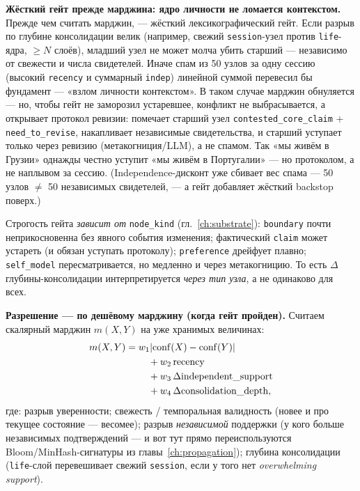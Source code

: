 \smallskip\noindent\textbf{Жёсткий гейт прежде марджина: ядро личности не ломается контекстом.}
Прежде чем считать марджин, --- жёсткий лексикографический гейт. Если разрыв
по глубине консолидации велик (например, свежий \texttt{session}-узел против
\texttt{life}-ядра, $\ge N$ слоёв), младший узел не может молча убить старший
--- независимо от свежести и числа свидетелей. Иначе спам из 50 узлов за одну
сессию (высокий \texttt{recency} и суммарный \texttt{indep}) линейной суммой
перевесил бы фундамент --- «взлом личности контекстом». В таком случае
марджин обнуляется --- но, чтобы гейт не заморозил устаревшее, конфликт не
выбрасывается, а открывает протокол ревизии: помечает старший узел
\texttt{contested\_core\_claim} + \texttt{need\_to\_revise}, накапливает
независимые свидетельства, и старший уступает только через ревизию
(метакогниция/LLM), а не спамом. Так «мы живём в Грузии» однажды честно
уступит «мы живём в Португалии» --- но протоколом, а не наплывом за сессию.
(Independence-дисконт уже сбивает вес спама --- 50 узлов $\ne$ 50 независимых
свидетелей, --- а гейт добавляет жёсткий backstop поверх.)

Строгость гейта \emph{зависит от} \texttt{node\_kind}
(гл.~\ref{ch:substrate}): \texttt{boundary} почти неприкосновенна без явного
события изменения; фактический \texttt{claim} может устареть (и обязан
уступать протоколу); \texttt{preference} дрейфует плавно; \texttt{self\_model}
пересматривается, но медленно и через метакогницию. То есть
$\Delta$глубины-консолидации интерпретируется \emph{через тип узла}, а не
одинаково для всех.

\smallskip\noindent\textbf{Разрешение --- по дешёвому марджину (когда гейт пройден).}
Считаем скалярный марджин $m(X,Y)$ на уже хранимых величинах:
\[
m(X,Y) =
\begin{aligned}[t]
&w_1 |\mathrm{conf}(X) - \mathrm{conf}(Y)| \\
&\quad + w_2\,\mathrm{recency} \\
&\quad + w_3\,\Delta\mathrm{independent\_support} \\
&\quad + w_4\,\Delta\mathrm{consolidation\_depth},
\end{aligned}
\]
где: разрыв уверенности; свежесть / темпоральная валидность (новее и про
текущее состояние --- весомее); разрыв \emph{независимой} поддержки (у кого
больше независимых подтверждений --- и вот тут прямо переиспользуются
Bloom/MinHash-сигнатуры из главы~\ref{ch:propagation}); глубина консолидации
(\texttt{life}-слой перевешивает свежий \texttt{session}, если у того нет
\textit{overwhelming support}).

